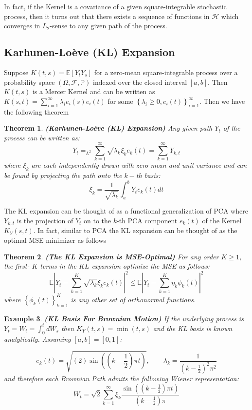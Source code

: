 \documentclass[11pt]{article}
\theoremstyle{plain} %
\newtheorem{theorem}{Theorem}[section]
\newtheorem{example}[theorem]{Example}
\theoremstyle{remark}
\begin{document}
In fact, if the Kernel is a covariance of a given square-integrable stochastic
process, then it turns out that there exists a sequence of functions in
$\mathcal{H}$ which converges in $L_{2}$-sense to any given path of the process.

\subsection{Karhunen-Loève (KL) Expansion}
Suppose $K(t, s)=\mathbb{E}\left[Y_{t} Y_{s}\right]$ for a zero-mean
square-integrable process over a probability space $(\Omega, \mathcal{F}, \mathbb{P})$
indexed over the closed interval $[a, b]$. Then $K(t, s)$ is a Mercer Kernel and
can be written as $K(s, t)=\sum_{i=1}^{\infty} \lambda_{i} e_{i}(s) e_{i}(t)$
for some $\left\{\lambda_{i} \geq 0, e_{i}(t)\right\}_{i=1}^{\infty}$. Then we
have the following theorem

\begin{theorem}\textbf{(Karhunen-Loève (KL) Expansion)}
  Any given path $Y_{t}$ of the process can be written as:
$$
  Y_{t}=_{L^{2}} \sum_{k=1}^{\infty} \sqrt{\lambda_{k}} \xi_{k} e_{k}(t)=\sum_{k=1}^{\infty} Y_{k, t}
$$
where $\xi_{k}$ are each independently drawn with zero mean and unit variance
and can be found by projecting the path onto the $k-$th basis:
$$
  \xi_{k}=\frac{1}{\sqrt{\lambda_{k}}} \int_{a}^{b} Y_{t} e_{k}(t) d t
$$
\end{theorem}

The KL expansion can be thought of as a functional generalization of
PCA where $Y_{k, t}$ is the projection of $Y_{t}$ on to the $k$-th PCA component
$e_{k}(t)$ of the Kernel $K_{Y}(s, t)$. In fact, similar to PCA the KL expansion can be thought of as the optimal MSE
minimizer as follows

\begin{theorem}\textbf{(The KL Expansion is MSE-Optimal)}
  For any order $K \geq 1$, the first- $K$ terms in the $K L$ expansion optimize
the MSE as follows:
$$
  \mathbb{E}\left|Y_{t}-\sum_{k=1}^{K} \sqrt{\lambda_{k}} \xi_{k} e_{k}(t)\right|^{2} \leq \mathbb{E}\left|Y_{t}-\sum_{k=1}^{K} \eta_{k} \phi_{k}(t)\right|^{2}
$$
where $\left\{\phi_{k}(t)\right\}_{k=1}^{K}$ is any other set of orthonormal
functions.
\end{theorem}

\begin{example}\textbf{(KL Basis For Brownian Motion)}
  If the underlying process is $Y_{t}=W_{t}=\int_{0}^{t} d W_{s}$ then $K_{Y}(t,
  s)=\min (t, s)$ and the KL basis is known analytically. Assuming $[a,b]=[0,1]$:

$$
    e_{k}(t)=\sqrt{(2) \sin \left(\left(k-\frac{1}{2}\right) \pi t\right)}, \qquad
    \lambda_{k} =\frac{1}{\left(k-\frac{1}{2}\right)^{2} \pi^{2}}
$$
and therefore each Brownian Path admits the following Wiener representation:
$$
  W_{t}=\sqrt{2} \sum_{k=1}^{\infty} \xi_{k} \frac{\sin \left(\left(k-\frac{1}{2}\right) \pi t\right)}{\left(k-\frac{1}{2}\right) \pi}
$$
\end{example}
\end{document}
